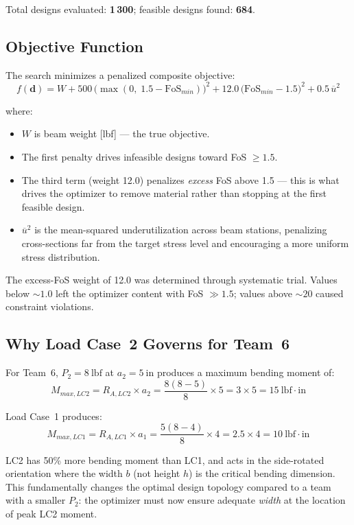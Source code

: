 \documentclass[11pt,letterpaper]{article}
\begin{document}
Total designs evaluated: \textbf{1\,300}; feasible designs found: \textbf{684}.

\subsection{Objective Function}

The search minimizes a penalized composite objective:
\[
  f(\mathbf{d}) = W
  + 500\,\bigl(\max(0,\;1.5 - \mathrm{FoS}_{min})\bigr)^2
  + 12.0\,\bigl(\mathrm{FoS}_{min} - 1.5\bigr)^2
  + 0.5\,\overline{u}^2
\]

where:
\begin{itemize}[noitemsep]
  \item $W$ is beam weight [lbf] --- the true objective.
  \item The first penalty drives infeasible designs toward FoS $\ge 1.5$.
  \item The third term (weight 12.0) penalizes \emph{excess} FoS above 1.5
    --- this is what drives the optimizer to remove material rather than
    stopping at the first feasible design.
  \item $\overline{u}^2$ is the mean-squared underutilization across beam
    stations, penalizing cross-sections far from the target stress level and
    encouraging a more uniform stress distribution.
\end{itemize}

The excess-FoS weight of 12.0 was determined through systematic trial.
Values below $\sim 1.0$ left the optimizer content with FoS $\gg 1.5$;
values above $\sim 20$ caused constraint violations.

\subsection{Why Load Case~2 Governs for Team~6}

For Team~6, $P_2 = 8\ \mathrm{lbf}$ at $a_2 = 5\ \mathrm{in}$
produces a maximum bending moment of:
\[
  M_{max,LC2} = R_{A,LC2} \times a_2
  = \frac{8(8-5)}{8} \times 5 = 3 \times 5 = 15\ \mathrm{lbf \cdot in}
\]

Load Case~1 produces:
\[
  M_{max,LC1} = R_{A,LC1} \times a_1
  = \frac{5(8-4)}{8} \times 4 = 2.5 \times 4 = 10\ \mathrm{lbf \cdot in}
\]

LC2 has 50\% more bending moment than LC1, and acts in the side-rotated
orientation where the width $b$ (not height $h$) is the critical bending
dimension.  This fundamentally changes the optimal design topology compared
to a team with a smaller $P_2$: the optimizer must now ensure adequate
\emph{width} at the location of peak LC2 moment.
\end{document}
